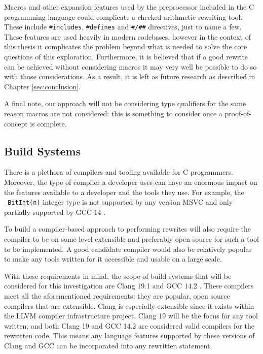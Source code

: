 Macros and other expansion features \cite{macros} used by the preprocessor included in the C programming language could complicate a checked arithmetic rewriting tool. These include \texttt{\#includes}, \texttt{\#defines} and \texttt{\#/\#\#} directives, just to name a few. These features are used heavily in modern codebases, however in the context of this thesis it complicates the problem beyond what is needed to solve the core questions of this exploration. Furthermore, it is believed that if a good rewrite can be achieved without considering macros it may very well be possible to do so with those considerations. As a result, it is left as future research as described in Chapter \ref{sec:conclusion}.

A final note, our approach will not be considering type qualifiers for the same reason macros are not considered: this is something to consider once a proof-of-concept is complete.

\subsection{Build Systems}

There is a plethora of compilers and tooling available for C programmers. Moreover, the type of compiler a developer uses can have an enormous impact on the features available to a developer and the tools they use. For example, the \texttt{\_BitInt(n)} integer type is not supported by any version MSVC and only partially supported by GCC 14 \cite{compiler_support}.

To build a compiler-based approach to performing rewrites will also require the compiler to be on some level extensible and preferably open source for such a tool to be implemented. A good candidate compiler would also be relatively popular to make any tools written for it accessible and usable on a large scale.

With these requirements in mind, the scope of build systems that will be considered for this investigation are Clang 19.1 \cite{clang19} and GCC 14.2 \cite{gcc14}. These compilers meet all the aforementioned requirements: they are popular, open source compilers that are extensible. Clang is especially extensible since it exists within the LLVM compiler infrastructure project. Clang 19 will be the focus for any tool written, and both Clang 19 and GCC 14.2 are considered valid compilers for the rewritten code. This means any language features supported by these versions of Clang and GCC can be incorporated into any rewritten statement.

